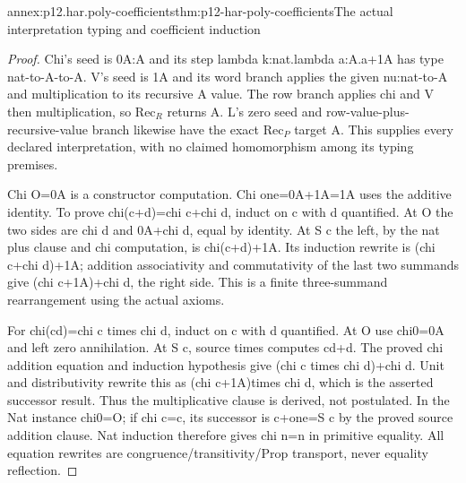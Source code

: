 \begin{annexitem}{annex:p12.har.poly-coefficients}{thm:p12-har-poly-coefficients}{The actual interpretation typing and coefficient induction}
\begin{proof}
Chi's seed is 0A:A and its step lambda k:nat.lambda a:A.a+1A
has type nat-to-A-to-A. V's seed is 1A and its word branch applies
the given nu:nat-to-A and multiplication to its recursive A value.
The row branch applies chi and V then multiplication, so \(\mathrm{Rec}_R\)
returns A. L's zero seed and row-value-plus-recursive-value branch
likewise have the exact \(\mathrm{Rec}_P\) target A. This supplies every declared
interpretation, with no claimed homomorphism among its typing premises.

Chi O=0A is a constructor computation. Chi one=0A+1A=1A uses the
additive identity. To prove chi(c+d)=chi c+chi d, induct on c
with d quantified. At O the two sides are chi d and 0A+chi d,
equal by identity. At S c the left, by the nat plus clause and
chi computation, is chi(c+d)+1A. Its induction rewrite is
(chi c+chi d)+1A; addition associativity and commutativity of the
last two summands give (chi c+1A)+chi d, the right side.
This is a finite three-summand rearrangement using the actual axioms.

For chi(cd)=chi c times chi d, induct on c with d quantified.
At O use chi0=0A and left zero annihilation. At S c, source times
computes cd+d. The proved chi addition equation and induction
hypothesis give (chi c times chi d)+chi d. Unit and distributivity
rewrite this as (chi c+1A)times chi d, which is the asserted
successor result. Thus the multiplicative clause is derived, not
postulated. In the Nat instance chi0=O; if chi c=c, its successor
is c+one=S c by the proved source addition clause. Nat induction
therefore gives chi n=n in primitive equality. All equation rewrites
are congruence/transitivity/Prop transport, never equality reflection.
\end{proof}
\end{annexitem}

